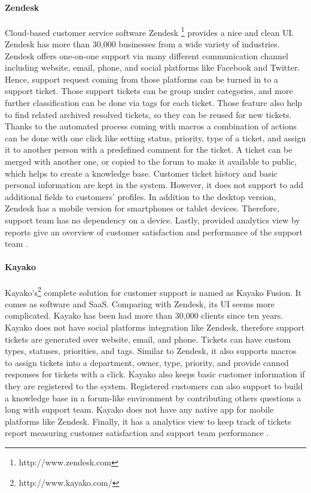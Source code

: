 \paragraph{Zendesk}
Cloud-based customer service software Zendesk \footnote{http://www.zendesk.com} provides a nice and clean \ac{UI}. Zendesk has more than 30,000 businesses from a wide variety of industries. Zendesk offers one-on-one support via many different communication channel including website, email, phone, and social platforms like Facebook and Twitter. Hence, support request coming from those platforms can be turned in to a support ticket. Those support tickets can be group under categories, and more further classification can be done via tags for each ticket. Those feature also help to find related archived resolved tickets, so they can be reused for new tickets. Thanks to the automated process coming with macros a combination of actions can be done with one click like setting status, priority, type of a ticket, and assign it to another person with a predefined comment for the ticket. A ticket can be merged with another one, or copied to the forum to make it available to public, which helps to create a knowledge base. Customer ticket history and basic personal information are kept in the system. However, it does not support to add additional fields to customers' profiles. In addition to the desktop version, Zendesk has a mobile version for smartphones or tablet devices. Therefore, support team has no dependency on a device. Lastly, provided analytics view by reports give an overview of customer satisfaction and performance of the support team \citep{Zendesk2013,Zendesk2013a}.

\paragraph{Kayako}
Kayako's\footnote{http://www.kayako.com/} complete solution for customer support is named as Kayako Fusion. It comes as software and \ac{SaaS}. Comparing with Zendesk, its \ac{UI} seems more complicated. Kayako has been had more than 30,000 clients since ten years. Kayako does not have social platforms integration like Zendesk, therefore support tickets are generated over website, email, and phone. Tickets can have custom types, statuses, priorities, and tags. Similar to Zendesk, it also supports macros to assign tickets into a department, owner, type, priority, and provide canned responses for tickets with a click. Kayako also keeps basic customer information if they are registered to the system. Registered customers can also support to build a knowledge base in a forum-like environment by contributing others questions a long with support team. Kayako does not have any native app for mobile platforms like Zendesk. Finally, it has a analytics view to keep track of tickets report measuring customer satisfaction and support team performance \citep{KayakoInc.2013,KayakoInc.2013a}.

